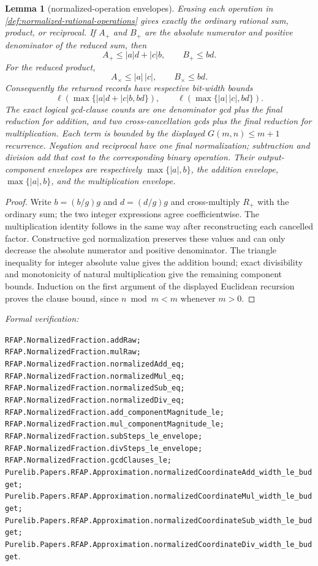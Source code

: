 \documentclass[11pt]{article}
\newtheorem{lemma}[lemma]{Lemma}
\newcommand{\leanref}[1]{\par\smallskip\noindent
  \emph{Formal verification:}\par\nobreak
  {\raggedright\nolinkurl{#1}.\par}}
\begin{document}
\begin{lemma}[normalized-operation envelopes]
\label{lem:normalized-operation-envelopes}
Erasing each operation in \cref{def:normalized-rational-operations} gives
exactly the ordinary rational sum, product, or reciprocal.  If $A_+$ and
$B_+$ are the absolute numerator and positive denominator of the reduced
sum, then
\[
 A_+\le |a|d+|c|b,
 \qquad B_+\le bd.
\]
For the reduced product,
\[
 A_\times\le |a|\,|c|,
 \qquad B_\times\le bd.
\]
Consequently the returned records have respective bit-width bounds
\[
 \ell\!\left(\max\{|a|d+|c|b,bd\}\right),
 \qquad
 \ell\!\left(\max\{|a|\,|c|,bd\}\right).
\]
The exact logical gcd-clause counts are one denominator gcd plus the final
reduction for addition, and two cross-cancellation gcds plus the final
reduction for multiplication.  Each term is bounded by the displayed
$G(m,n)\le m+1$ recurrence.  Negation and reciprocal have one final
normalization; subtraction and division add that cost to the corresponding
binary operation.  Their output-component envelopes are respectively
$\max\{|a|,b\}$, the addition envelope, $\max\{|a|,b\}$, and the
multiplication envelope.
\end{lemma}

\begin{proof}
Write $b=(b/g)g$ and $d=(d/g)g$ and cross-multiply $R_+$ with the ordinary
sum; the two integer expressions agree coefficientwise.  The multiplication
identity follows in the same way after reconstructing each cancelled factor.
Constructive gcd normalization preserves these values and can only decrease
the absolute numerator and positive denominator.  The triangle inequality
for integer absolute value gives the addition bound; exact divisibility and
monotonicity of natural multiplication give the remaining component bounds.
Induction on the first argument of the displayed Euclidean recursion proves
the clause bound, since $n\bmod m<m$ whenever $m>0$.
\end{proof}

\leanref{RFAP.NormalizedFraction.addRaw;
RFAP.NormalizedFraction.mulRaw;
RFAP.NormalizedFraction.normalizedAdd_eq;
RFAP.NormalizedFraction.normalizedMul_eq;
RFAP.NormalizedFraction.normalizedSub_eq;
RFAP.NormalizedFraction.normalizedDiv_eq;
RFAP.NormalizedFraction.add_componentMagnitude_le;
RFAP.NormalizedFraction.mul_componentMagnitude_le;
RFAP.NormalizedFraction.subSteps_le_envelope;
RFAP.NormalizedFraction.divSteps_le_envelope;
RFAP.NormalizedFraction.gcdClauses_le;
Purelib.Papers.RFAP.Approximation.normalizedCoordinateAdd_width_le_budget;
Purelib.Papers.RFAP.Approximation.normalizedCoordinateMul_width_le_budget;
Purelib.Papers.RFAP.Approximation.normalizedCoordinateSub_width_le_budget;
Purelib.Papers.RFAP.Approximation.normalizedCoordinateDiv_width_le_budget}
\end{document}
